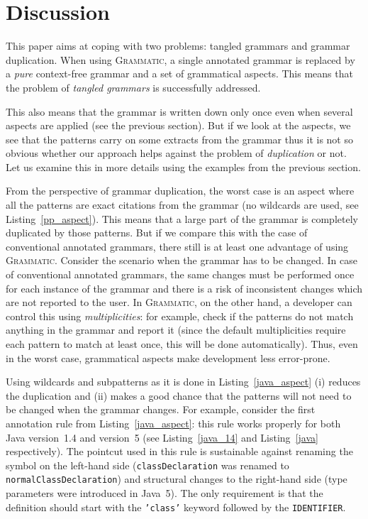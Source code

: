 \documentclass{IOS-Book-Article}     %
\newcommand{\lstref}[1]{Listing~\ref{#1}}
\newcommand{\tool}[1]{\textsc{#1}}
\newcommand{\Grammatic}[0]{\tool{Grammatic}}
\begin{document}
\section{Discussion}\label{Discussion}

This paper aims at coping with two problems: tangled grammars and grammar duplication. 
When using \Grammatic{}, a single annotated grammar is replaced by a \emph{pure} context-free grammar and a set of grammatical aspects. This means that the problem of \emph{tangled grammars} is successfully addressed.

This also means that the grammar is written down only once even when several aspects are applied (see the previous section). But if we look at the aspects, we see that the patterns carry on some extracts from the grammar thus it is not so obvious whether our approach helps against the problem of \emph{duplication} or not. Let us examine this in more details using the examples from the previous section.

From the perspective of grammar duplication, the worst case is an aspect where all the patterns are exact citations from the grammar (no wildcards are used, see \lstref{pp_aspect}). This means that a large part of the grammar is completely duplicated by those patterns. But if we compare this with the case of conventional annotated grammars, there still is at least one advantage of using \Grammatic{}. Consider the scenario when the grammar has to be changed. In case of conventional annotated grammars, the same changes must be performed once for each instance of the grammar and there is a risk of inconsistent changes which are not reported to the user. In \Grammatic{}, on the other hand, a developer can control this using \emph{multiplicities}: for example, check if the patterns do not match anything in the grammar and report it (since the default multiplicities require each pattern to match at least once, this will be done automatically). Thus, even in the worst case, grammatical aspects make development less error-prone.

Using wildcards and subpatterns as it is done in \lstref{java_aspect} (i) reduces the duplication and (ii) makes a good chance that the patterns will not need to be changed when the grammar changes. For example, consider the first annotation rule from \lstref{java_aspect}: this rule works properly for both Java version~1.4 and version~5 (see \lstref{java_14} and \lstref{java} respectively). The pointcut used in this rule is sustainable against renaming the symbol on the left-hand side (\texttt{classDeclaration} was renamed to \texttt{normalClassDeclaration}) and structural changes to the right-hand side (type parameters were introduced in Java~5). The only requirement is that the definition should start with the \texttt{'class'} keyword followed by the \texttt{IDENTIFIER}.
\end{document}
